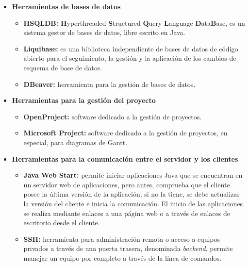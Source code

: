 \begin{itemize}
\item \textbf{Herramientas de bases de datos}
\begin{itemize}
\item \textbf{HSQLDB: }\textbf{H}yperthreaded \textbf{S}tructured \textbf{Q}uery \textbf{L}anguage \textbf{D}ata\textbf{B}ase, es un sistema gestor de bases de datos, libre escrito en Java\cite{HSQLDB}. 
\end{itemize}
\begin{itemize}
\item \textbf{Liquibase: }es una biblioteca independiente de bases de datos de código abierto para el seguimiento, la gestión y la aplicación de los cambios de esquema de base de datos\cite{Liquibase}.
\end{itemize}
\begin{itemize}
\item \textbf{DBeaver: }herramienta para la gestión de bases de datos\cite{DBeaver}.
\end{itemize}
\end{itemize}

\begin{itemize}
\item \textbf{Herramientas para la gestión del proyecto}
\begin{itemize}
\item \textbf{OpenProject:} software dedicado a la gestión de proyectos\cite{OpenProject}.
\item \textbf{Microsoft Project:} software dedicado a la gestión de proyectos, en especial, para diagramas de Gantt\cite{MicrosoftProject}.
\end{itemize}
\end{itemize}

\begin{itemize}
\item \textbf{Herramientas para la comunicación entre el servidor y los clientes} 
\begin{itemize}
\item \textbf{Java Web Start:} permite iniciar aplicaciones Java que se encuentran en un servidor web de aplicaciones, pero antes, comprueba que el cliente posee la última versión de la aplicación, si no la tiene, se debe actualizar la versión del cliente e inicia la comunicación. El inicio de las aplicaciones se realiza mediante enlaces a una página web o a través de enlaces de escritorio desde el cliente\cite{JavaWebStart}.
\item \textbf{SSH:} herramienta para administración remota o acceso a equipos privados a través de una puerta trasera, denominada \textit{backend}, permite manejar un equipo por completo a través de la línea de comandos\cite{SSH}.
\end{itemize}
\end{itemize}

